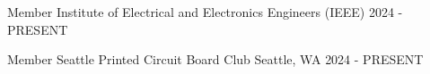 

\begin{cventries}
	
  \cventry
    {Member} %
    {Institute of Electrical and Electronics Engineers (IEEE)} %
    {} %
    {2024 - PRESENT} %
    {}

  \cventry
    {Member} %
    {Seattle Printed Circuit Board Club} %
    {Seattle, WA} %
    {2024 - PRESENT} %
    {}
	
\end{cventries}

